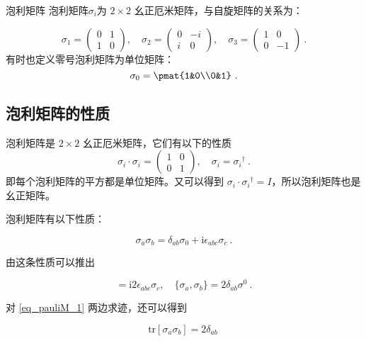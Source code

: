 \begin{definition}{泡利矩阵}\label{def_pauliM_1}
泡利矩阵$\sigma_i$为 $2\times 2$ 幺正厄米矩阵，与自旋矩阵的关系为：

\begin{equation}
\sigma_1 = \begin{pmatrix}
0 & 1\\
1 & 0
\end{pmatrix},\quad 
\sigma_2 = \begin{pmatrix}
0 & -i\\
i & 0
\end{pmatrix},\quad 
\sigma_3 = 
\begin{pmatrix}
1 & 0\\
0 & -1
\end{pmatrix}
~.
\end{equation}
有时也定义零号泡利矩阵为单位矩阵：
\begin{equation}
\sigma_0 = \pmat{1&0\\0&1}~.
\end{equation}

\end{definition}

\subsection{泡利矩阵的性质}
泡利矩阵是 $2\times 2$ 幺正厄米矩阵，它们有以下的性质
\begin{equation}
\sigma_i\cdot \sigma_i = \begin{pmatrix}1&0\\0&1\end{pmatrix},\quad \sigma_i = {\sigma_i}^\dagger~.
\end{equation}
即每个泡利矩阵的平方都是单位矩阵。又可以得到 $\sigma_i \cdot  \sigma_i{}^\dagger = I$，所以泡利矩阵也是幺正矩阵。

泡利矩阵有以下性质：
\begin{theorem}{}
\begin{equation}\label{eq_pauliM_1}
\sigma_a\sigma_b = \delta_{ab}\sigma_0 + \mathrm{i}\epsilon_{abc}\sigma_c~.
\end{equation}
\end{theorem}
由这条性质可以推出
\begin{lemma}{}
\begin{equation}
[\sigma_a,\sigma_b] = \mathrm{i}2\epsilon_{abc}\sigma_c,\quad \{\sigma_a,\sigma_b\}=2\delta_{ab}\sigma^0~.
\end{equation}
\end{lemma}
对 \autoref{eq_pauliM_1} 两边求迹，还可以得到
\begin{lemma}{}
\begin{equation}
\mathrm{tr}[\sigma_a \sigma_b]= 2\delta_{ab} ~
\end{equation}
\end{lemma}
